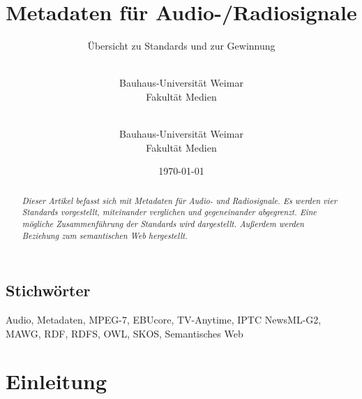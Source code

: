 

\title{Metadaten für Audio-/Radiosignale}
\subtitle{Übersicht zu Standards und zur Gewinnung}
\date{\today}
\author{
	\\
	Bauhaus-Universität Weimar\\
	Fakultät Medien\\
\and
	\\
	Bauhaus-Universität Weimar\\
	Fakultät Medien\\
}



	\maketitle
	
	\begin{abstract}
		\emph{Dieser Artikel befasst sich mit Metadaten für Audio- und Radiosignale. Es werden vier Standards vorgestellt, miteinander verglichen und gegeneinander abgegrenzt. Eine mögliche Zusammenführung der Standards wird dargestellt. Außerdem werden Beziehung zum semantischen Web hergestellt.}
	\end{abstract}
	
	\subsection{Stichwörter}
	Audio, Metadaten, MPEG-7, EBUcore, TV-Anytime, IPTC NewsML-G2, MAWG, RDF, RDFS, OWL, SKOS, Semantisches Web
	
	\section{Einleitung}
	

